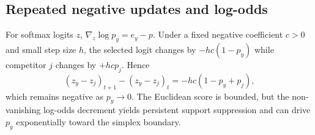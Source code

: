 
\subsection{Repeated negative updates and log-odds}
For softmax logits $z$, $\nabla_z\log p_y=e_y-p$. Under a fixed negative coefficient $c>0$ and small step size $h$, the selected logit changes by $-hc(1-p_y)$ while competitor $j$ changes by $+hc p_j$. Hence
\begin{equation}
(z_y-z_j)_{t+1}-(z_y-z_j)_t=-hc(1-p_y+p_j),
\end{equation}
which remains negative as $p_y\to0$. The Euclidean score is bounded, but the non-vanishing log-odds decrement yields persistent support suppression and can drive $p_y$ exponentially toward the simplex boundary.
